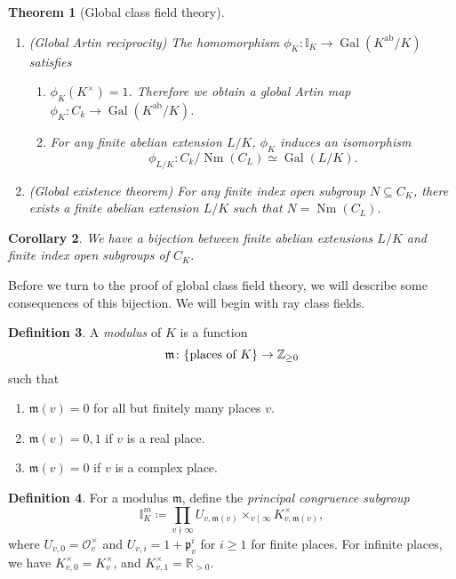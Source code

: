\documentclass[leqno, openany]{memoir}
\newtheorem{thm}{Theorem}[section]
\newtheorem{cor}[thm]{Corollary}
\theoremstyle{definition}
\newtheorem{defn}[thm]{Definition}
\theoremstyle{remark}
\theoremstyle{plain}
\theoremstyle{definition}
\theoremstyle{remark}
\newcommand{\R}{\mathbb{R}}
\newcommand{\Z}{\mathbb{Z}}
\newcommand{\I}{\mathbb{I}}
\newcommand{\mc}[1]{\mathcal{#1}}
\newcommand{\mf}[1]{\mathfrak{#1}}
\newcommand{\mr}[1]{\mathrm{#1}}
\DeclareMathOperator{\Gal}{Gal}
\DeclareMathOperator{\Nm}{Nm}
\begin{document}
\begin{thm}[Global class field theory]\leavevmode
    \begin{enumerate}
        \item (Global Artin reciprocity) The homomorphism $\phi_K \colon \I_K \to \Gal(K^{\mr{ab}}/K)$ satisfies
            \begin{enumerate}
                \item $\phi_K(K^{\times}) = 1$. Therefore we obtain a global Artin map $\phi_K \colon C_k \to \Gal(K^{\mr{ab}}/K)$.
                \item For any finite abelian extension $L/K$, $\phi_K$ induces an isomorphism 
                    \[ \phi_{L/K} \colon C_k/\Nm(C_L) \simeq \Gal(L/K). \]
            \end{enumerate}
        \item (Global existence theorem) For any finite index open subgroup $N \subseteq C_K$, there exists a finite abelian extension $L/K$ such that $N = \Nm(C_L)$.
    \end{enumerate}
\end{thm}

\begin{cor}
    We have a bijection between finite abelian extensions $L/K$ and finite index open subgroups of $C_K$.
\end{cor}

Before we turn to the proof of global class field theory, we will describe some consequences of this bijection. We will begin with ray class fields.

\begin{defn}
    A \textit{modulus} of $K$ is a function
    \[ \mf{m} \colon \qty{\text{places of $K$}} \to \Z_{\geq 0} \]
    such that 
    \begin{enumerate}
        \item $\mf{m}(v) = 0$ for all but finitely many places $v$.
        \item $\mf{m}(v) = 0,1$ if $v$ is a real place.
        \item $\mf{m}(v) = 0$ if $v$ is a complex place.
    \end{enumerate}
\end{defn}


\begin{defn}
    For a modulus $\mf{m}$, define the \textit{principal congruence subgroup}
    \[ \I_K^m \coloneqq \prod_{v \nmid \infty} U_{v, \mf{m}(v)} \times_{v \mid \infty} K_{v, \mf{m}(v)}^{\times}, \]
    where $U_{v,0} = \mc{O}_v^{\times}$ and $U_{v,i} = 1 + \mf{p}_v^i$ for $i \geq 1$ for finite places. For infinite places, we have $K_{v,0}^{\times} = K_v^{\times}$, and $K_{v,1}^{\times} = \R_{>0}$.
\end{defn}
\end{document}
